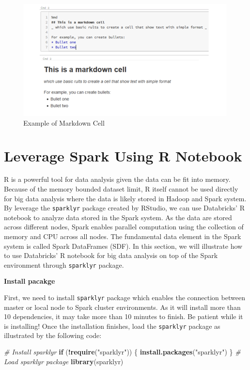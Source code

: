 \documentclass[12pt,]{krantz}
\makeatletter
\newenvironment{Shaded}{\begin{snugshade}}{\end{snugshade}}
\newcommand{\CommentTok}[1]{\textcolor[rgb]{0.37,0.37,0.37}{\textit{#1}}}
\newcommand{\ControlFlowTok}[1]{\textcolor[rgb]{0.27,0.27,0.27}{\textbf{#1}}}
\newcommand{\KeywordTok}[1]{\textcolor[rgb]{0.27,0.27,0.27}{\textbf{#1}}}
\newcommand{\NormalTok}[1]{#1}
\newcommand{\OperatorTok}[1]{\textcolor[rgb]{0.43,0.43,0.43}{\textbf{#1}}}
\newcommand{\StringTok}[1]{\textcolor[rgb]{0.5,0.5,0.5}{#1}}
\newenvironment{kframe}{%
\medskip{}
\setlength{\fboxsep}{.8em}
 \def\at@end@of@kframe{}%
 \ifinner\ifhmode%
  \def\at@end@of@kframe{\end{minipage}}%
  \begin{minipage}{\columnwidth}%
 \fi\fi%
 \def\FrameCommand##1{\hskip\@totalleftmargin \hskip-\fboxsep
 \colorbox{shadecolor}{##1}\hskip-\fboxsep
     \hskip-\linewidth \hskip-\@totalleftmargin \hskip\columnwidth}%
 \MakeFramed {\advance\hsize-\width
   \@totalleftmargin\z@ \linewidth\hsize
   \@setminipage}}%
 {\par\unskip\endMakeFramed%
 \at@end@of@kframe}
\renewenvironment{Shaded}{\begin{kframe}}{\end{kframe}}
\makeatother
\begin{document}
\begin{figure}

{\centering \includegraphics[width=0.8\linewidth]{images/dbxmarkdown} 

}

\caption{Example of Markdown Cell}\label{fig:dbxmarkdown}
\end{figure}

\hypertarget{leverage-spark-using-r-notebook}{%
\section{Leverage Spark Using R Notebook}\label{leverage-spark-using-r-notebook}}

R is a powerful tool for data analysis given the data can be fit into memory. Because of the memory bounded dataset limit, R itself cannot be used directly for big data analysis where the data is likely stored in Hadoop and Spark system. By leverage the \texttt{sparklyr} package created by RStudio, we can use Databricks' R notebook to analyze data stored in the Spark system. As the data are stored across different nodes, Spark enables parallel computation using the collection of memory and CPU across all nodes. The fundamental data element in the Spark system is called Spark DataFrames (SDF). In this section, we will illustrate how to use Databricks' R notebook for big data analysis on top of the Spark environment through \texttt{sparklyr} package.

\textbf{Install pacakge}

First, we need to install \texttt{sparklyr} package which enables the connection between master or local node to Spark cluster environments. As it will install more than 10 dependencies, it may take more than 10 minutes to finish. Be patient while it is installing! Once the installation finishes, load the \texttt{sparklyr} package as illustrated by the following code:

\begin{Shaded}
\begin{Highlighting}[]
\CommentTok{# Install sparklyr}
\ControlFlowTok{if}\NormalTok{ (}\OperatorTok{!}\KeywordTok{require}\NormalTok{(}\StringTok{"sparklyr"}\NormalTok{)) \{}
\KeywordTok{install.packages}\NormalTok{(}\StringTok{"sparklyr"}\NormalTok{)}
\NormalTok{\}}
\CommentTok{# Load sparklyr package}
\KeywordTok{library}\NormalTok{(sparklyr)}
\end{Highlighting}
\end{Shaded}
\end{document}

